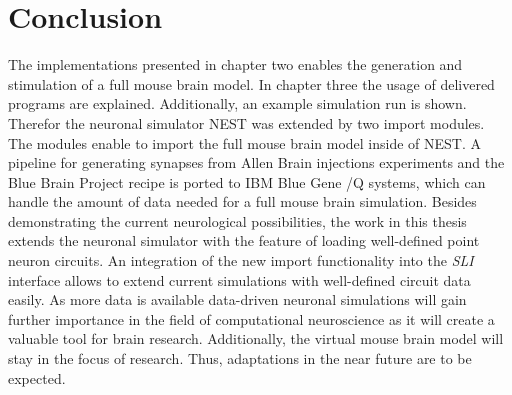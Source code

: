 






\section{Conclusion}
The implementations presented in chapter two enables the generation and stimulation of a full mouse brain model.
In chapter three the usage of delivered programs are explained. Additionally, an example simulation run is shown.
Therefor the neuronal simulator NEST was extended by two import modules. The modules
enable to import the full mouse brain model inside of NEST.
A pipeline for generating synapses from Allen Brain injections experiments and the Blue Brain Project recipe
is ported to IBM Blue Gene /Q systems, which can handle the amount of data needed for a full mouse brain simulation.
Besides demonstrating the current neurological possibilities, the work in this thesis extends the neuronal simulator with the feature of loading well-defined
point neuron circuits. An integration of the new import functionality into the \emph{SLI}
interface allows to extend current simulations with well-defined circuit data easily. 
As more data is available data-driven neuronal simulations will gain further importance in the field of computational neuroscience as it will create a valuable tool for brain research.
Additionally, the virtual mouse brain model will stay in the focus of research.
Thus, adaptations in the near future are to be expected.

